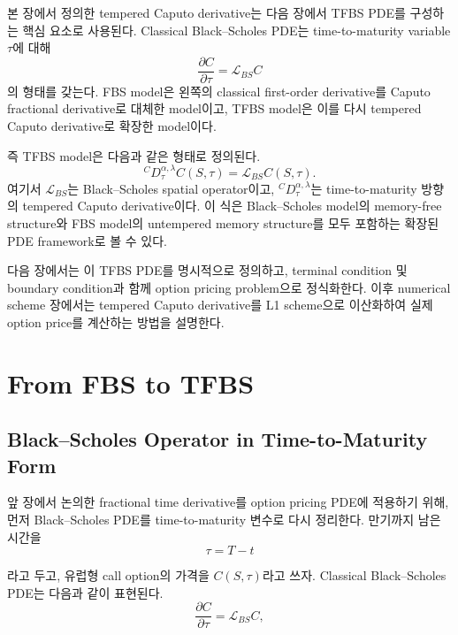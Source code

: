 \documentclass[11pt,a4paper]{report}
\begin{document}
본 장에서 정의한 tempered Caputo derivative는 다음 장에서 TFBS PDE를 구성하는 핵심 요소로 사용된다. Classical Black--Scholes PDE는 time-to-maturity variable $\tau$에 대해
\[
\frac{\partial C}{\partial \tau}
=
\mathcal{L}_{BS}C
\]
의 형태를 갖는다. FBS model은 왼쪽의 classical first-order derivative를 Caputo fractional derivative로 대체한 model이고, TFBS model은 이를 다시 tempered Caputo derivative로 확장한 model이다.

즉 TFBS model은 다음과 같은 형태로 정의된다.
\[
{}^C D_\tau^{\alpha,\lambda} C(S,\tau)
=
\mathcal{L}_{BS}C(S,\tau).
\]
여기서 $\mathcal{L}_{BS}$는 Black--Scholes spatial operator이고, ${}^C D_\tau^{\alpha,\lambda}$는 time-to-maturity 방향의 tempered Caputo derivative이다. 이 식은 Black--Scholes model의 memory-free structure와 FBS model의 untempered memory structure를 모두 포함하는 확장된 PDE framework로 볼 수 있다.

다음 장에서는 이 TFBS PDE를 명시적으로 정의하고, terminal condition 및 boundary condition과 함께 option pricing problem으로 정식화한다. 이후 numerical scheme 장에서는 tempered Caputo derivative를 L1 scheme으로 이산화하여 실제 option price를 계산하는 방법을 설명한다.




























\chapter{From FBS to TFBS}

\section{Black--Scholes Operator in Time-to-Maturity Form}

앞 장에서 논의한 fractional time derivative를 option pricing PDE에 적용하기 위해, 먼저 Black--Scholes PDE를 time-to-maturity 변수로 다시 정리한다. 만기까지 남은 시간을
\[
\tau = T-t
\]

라고 두고, 유럽형 call option의 가격을 $C(S,\tau)$라고 쓰자. Classical Black--Scholes PDE는 다음과 같이 표현된다.
\[
\frac{\partial C}{\partial \tau}
=
\mathcal{L}_{BS}C,
\]
\end{document}
